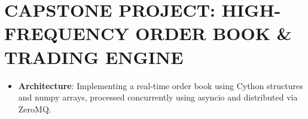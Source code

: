 \hypertarget{capstone-project-high-frequency-order-book-trading-engine}{%
\chapter{CAPSTONE PROJECT: HIGH-FREQUENCY ORDER BOOK \& TRADING
ENGINE}\label{capstone-project-high-frequency-order-book-trading-engine}}

\begin{itemize}
\tightlist
\item
  \textbf{Architecture}: Implementing a real-time order book using
  Cython structures and numpy arrays, processed concurrently using
  asyncio and distributed via ZeroMQ.
\end{itemize}
